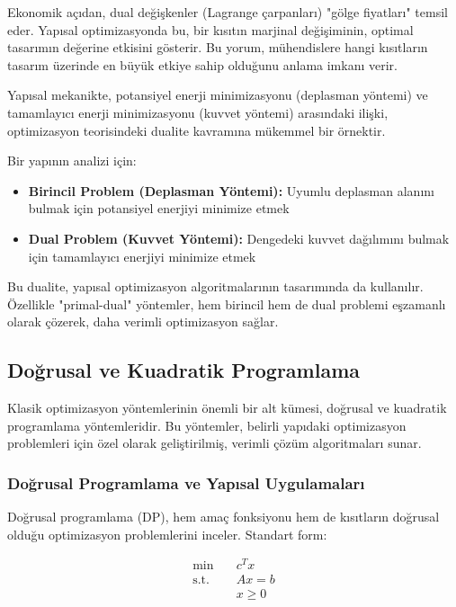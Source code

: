 Ekonomik açıdan, dual değişkenler (Lagrange çarpanları) "gölge fiyatları" temsil eder. Yapısal optimizasyonda bu, bir kısıtın marjinal değişiminin, optimal tasarımın değerine etkisini gösterir. Bu yorum, mühendislere hangi kısıtların tasarım üzerinde en büyük etkiye sahip olduğunu anlama imkanı verir.

\begin{tcolorbox}[title=Dualite ve Yapısal Analiz Arasındaki İlişki]
Yapısal mekanikte, potansiyel enerji minimizasyonu (deplasman yöntemi) ve tamamlayıcı enerji minimizasyonu (kuvvet yöntemi) arasındaki ilişki, optimizasyon teorisindeki dualite kavramına mükemmel bir örnektir. 

Bir yapının analizi için:
\begin{itemize}
    \item \textbf{Birincil Problem (Deplasman Yöntemi):} Uyumlu deplasman alanını bulmak için potansiyel enerjiyi minimize etmek
    \item \textbf{Dual Problem (Kuvvet Yöntemi):} Dengedeki kuvvet dağılımını bulmak için tamamlayıcı enerjiyi minimize etmek
\end{itemize}

Bu dualite, yapısal optimizasyon algoritmalarının tasarımında da kullanılır. Özellikle "primal-dual" yöntemler, hem birincil hem de dual problemi eşzamanlı olarak çözerek, daha verimli optimizasyon sağlar.
\end{tcolorbox}

\subsection{Doğrusal ve Kuadratik Programlama}

Klasik optimizasyon yöntemlerinin önemli bir alt kümesi, doğrusal ve kuadratik programlama yöntemleridir. Bu yöntemler, belirli yapıdaki optimizasyon problemleri için özel olarak geliştirilmiş, verimli çözüm algoritmaları sunar.

\subsubsection{Doğrusal Programlama ve Yapısal Uygulamaları}

Doğrusal programlama (DP), hem amaç fonksiyonu hem de kısıtların doğrusal olduğu optimizasyon problemlerini inceler. Standart form:

\begin{equation}
\begin{aligned}
\min & \quad c^T x \\
\text{s.t.} & \quad Ax = b \\
& \quad x \geq 0
\end{aligned}
\end{equation}

